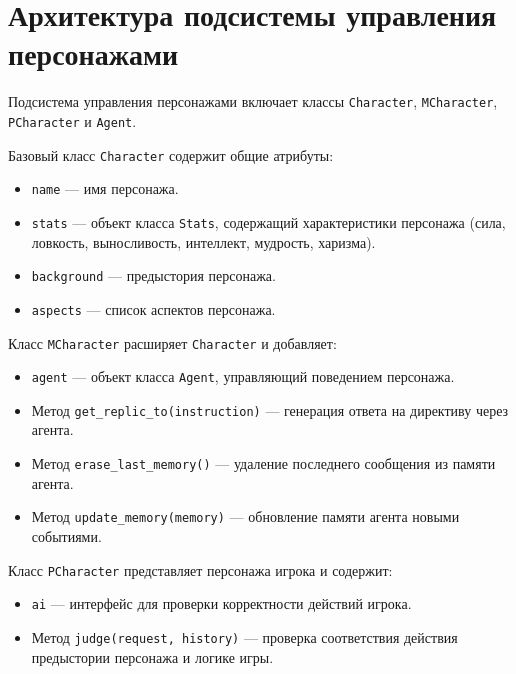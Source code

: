 \section{Архитектура подсистемы управления персонажами}

Подсистема управления персонажами включает классы \texttt{Character}, \texttt{MCharacter}, \texttt{PCharacter} и \texttt{Agent}.

Базовый класс \texttt{Character} содержит общие атрибуты:
\begin{itemize}
	\item \texttt{name} --- имя персонажа.
	
	\item \texttt{stats} --- объект класса \texttt{Stats}, содержащий характеристики персонажа (сила, ловкость, выносливость, интеллект, мудрость, харизма).
	
	\item \texttt{background} --- предыстория персонажа.
	
	\item \texttt{aspects} --- список аспектов персонажа.
\end{itemize}

Класс \texttt{MCharacter} расширяет \texttt{Character} и добавляет:
\begin{itemize}
	\item \texttt{agent} --- объект класса \texttt{Agent}, управляющий поведением персонажа.
	
	\item Метод \texttt{get\_replic\_to(instruction)} --- генерация ответа на директиву через агента.
	
	\item Метод \texttt{erase\_last\_memory()} --- удаление последнего сообщения из памяти агента.
	
	\item Метод \texttt{update\_memory(memory)} --- обновление памяти агента новыми событиями.
\end{itemize}

Класс \texttt{PCharacter} представляет персонажа игрока и содержит:
\begin{itemize}
	\item \texttt{ai} --- интерфейс для проверки корректности действий игрока.
	
	\item Метод \texttt{judge(request, history)} --- проверка соответствия действия предыстории персонажа и логике игры.
\end{itemize}

